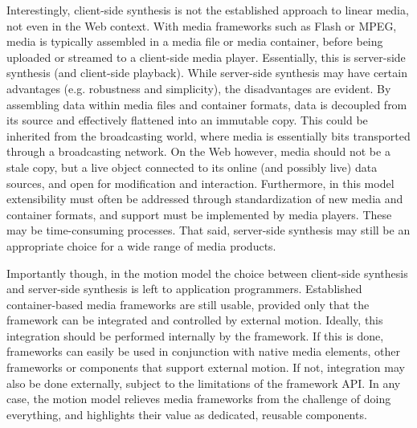 Interestingly, client-side synthesis is not the established approach to linear
media, not even in the Web context. With media frameworks such as Flash or
MPEG, media is typically assembled in a media file or media container, before
being uploaded or streamed to a client-side media player. Essentially, this is
server-side synthesis (and client-side playback). While server-side synthesis
may have certain advantages (e.g. robustness and simplicity), the
disadvantages are evident. By assembling data within media files and container
formats, data is decoupled from its source and effectively flattened into an
immutable copy. This could be inherited from the broadcasting world, where
media is essentially bits transported through a broadcasting network. On the
Web however, media should not be a stale copy, but a live object connected to
its online (and possibly live) data sources, and open for modification and
interaction. Furthermore, in this model extensibility must often be addressed
through standardization of new media and container formats, and support must
be implemented by media players. These may be time-consuming processes. That
said, server-side synthesis may still be an appropriate choice for a wide
range of media products.

Importantly though, in the motion model the choice between client-side 
synthesis and server-side synthesis is left to application programmers.
Established container-based media frameworks are still usable, provided only
that the framework can be integrated and controlled by external motion.
Ideally, this integration should be performed internally by the framework. If
this is done, frameworks can easily be used in conjunction with native media
elements, other frameworks or components that support external motion. If not,
integration may also be done externally, subject to the limitations of the
framework API. In any case, the motion model relieves media
frameworks from the challenge of doing everything, and highlights their value
as dedicated, reusable components.

